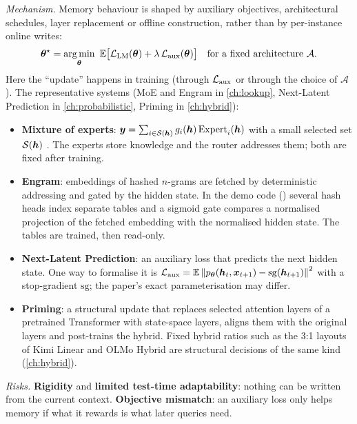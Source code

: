 \emph{Mechanism.} Memory behaviour is shaped by auxiliary objectives, architectural schedules,
layer replacement or offline construction, rather than by per-instance online writes:
\begin{equation}\label{eq:c02-structural}
  \bm{\theta}^\star = \operatorname*{arg\,min}_{\bm{\theta}}\ \mathbb{E}\big[\mathcal{L}_{\mathrm{LM}}(\bm{\theta}) + \lambda\,\mathcal{L}_{\mathrm{aux}}(\bm{\theta})\big]
  \quad\text{for a fixed architecture } \mathcal{A}.
\end{equation}
Here the ``update'' happens in training (through $\mathcal{L}_{\mathrm{aux}}$ or through the choice of
$\mathcal{A}$). The representative systems (MoE and Engram in \cref{ch:lookup}, Next-Latent
Prediction in \cref{ch:probabilistic}, Priming in \cref{ch:hybrid}):
\begin{itemize}
  \item \textbf{Mixture of experts}: $\bm{y} = \sum_{i\in\mathcal{S}(\bm{h})} g_i(\bm{h})\,\mathrm{Expert}_i(\bm{h})$
        with a small selected set $\mathcal{S}(\bm{h})$ \citep[Eq.~(1)]{zhoubian2026memory}. The
        experts store knowledge and the router addresses them; both are fixed after training.
  \item \textbf{Engram}: embeddings of hashed $n$-grams are fetched by deterministic addressing and
        gated by the hidden state. In the demo code
        () several hash heads index
        separate tables and a sigmoid gate compares a normalised projection of the fetched
        embedding with the normalised hidden state. The tables are trained, then read-only.
  \item \textbf{Next-Latent Prediction}: an auxiliary loss that predicts the next hidden state.
        One way to formalise it is
        $\mathcal{L}_{\mathrm{aux}} = \mathbb{E}\left\lVert p_{\bm{\theta}}(\bm{h}_t, \bm{x}_{t+1}) - \mathrm{sg}(\bm{h}_{t+1})\right\rVert^2$
        with a stop-gradient $\mathrm{sg}$; the paper's exact parameterisation may differ.
  \item \textbf{Priming}: a structural update that replaces selected attention layers of a
        pretrained Transformer with state-space layers, aligns them with the original layers and
        post-trains the hybrid. Fixed hybrid ratios such as the 3:1 layouts of Kimi Linear and
        OLMo Hybrid are structural decisions of the same kind (\cref{ch:hybrid}).
\end{itemize}

\emph{Risks.} \textbf{Rigidity} and \textbf{limited test-time adaptability}: nothing can be written
from the current context. \textbf{Objective mismatch}: an auxiliary loss only helps memory if what
it rewards is what later queries need.

